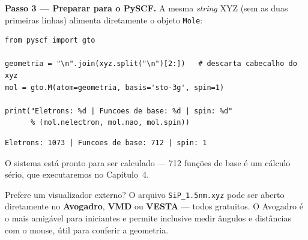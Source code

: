 \documentclass[11pt,a4paper,openany]{book}
\newcommand{\code}[1]{\texttt{#1}}
\begin{document}
\begin{caixamaos}
\vspace{0.3cm}
\textbf{Passo 3 --- Preparar para o PySCF.} A mesma \emph{string} XYZ (sem as duas
primeiras linhas) alimenta diretamente o objeto \code{Mole}:

\begin{lstlisting}[style=python]
from pyscf import gto

geometria = "\n".join(xyz.split("\n")[2:])   # descarta cabecalho do xyz
mol = gto.M(atom=geometria, basis='sto-3g', spin=1)

print("Eletrons: %d | Funcoes de base: %d | spin: %d"
      % (mol.nelectron, mol.nao, mol.spin))
\end{lstlisting}

\begin{lstlisting}[style=console]
Eletrons: 1073 | Funcoes de base: 712 | spin: 1
\end{lstlisting}

O sistema está pronto para ser calculado --- 712 funções de base é um cálculo
sério, que executaremos no Capítulo~4.
\end{caixamaos}

\begin{caixadica}
Prefere um visualizador externo? O arquivo \code{SiP\_1.5nm.xyz} pode ser aberto
diretamente no \textbf{Avogadro}, \textbf{VMD} ou \textbf{VESTA} --- todos
gratuitos. O Avogadro é o mais amigável para iniciantes e permite inclusive
medir ângulos e distâncias com o mouse, útil para conferir a geometria.
\end{caixadica}
\end{document}
